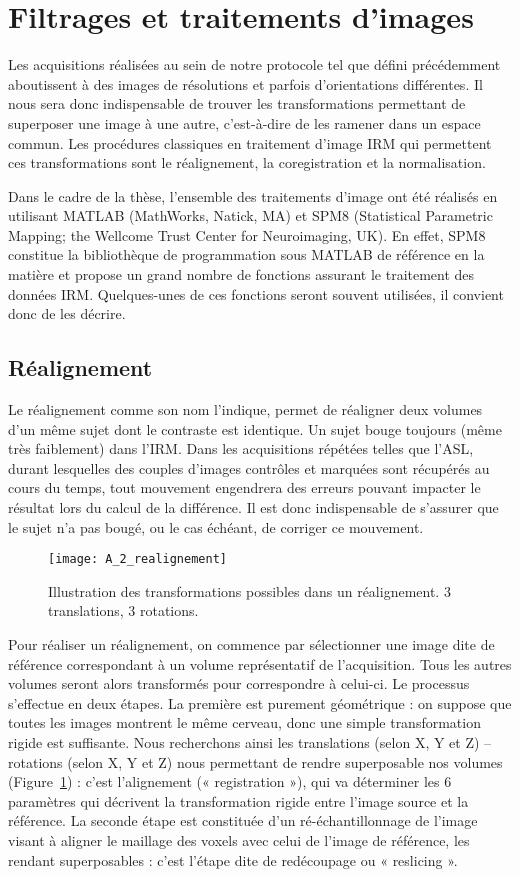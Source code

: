 \section{Filtrages et traitements d’images}
\label{sec:pretrait}
Les acquisitions réalisées au sein de notre protocole tel que défini précédemment aboutissent
à des images de résolutions et parfois d’orientations différentes. Il nous sera donc indispensable de
trouver les transformations permettant de superposer une image à une autre, c’est-à-dire de les
ramener dans un espace commun. Les procédures classiques en traitement d’image IRM qui
permettent ces transformations sont le réalignement, la coregistration et la normalisation.

Dans le cadre de la thèse, l’ensemble des traitements d’image ont été réalisés en utilisant
MATLAB (MathWorks, Natick, MA) et SPM8 (Statistical Parametric Mapping; the Wellcome Trust
Center for Neuroimaging, UK). En effet, SPM8 constitue la bibliothèque de programmation sous
MATLAB de référence en la matière et propose un grand nombre de fonctions assurant le traitement
des données IRM. Quelques-unes de ces fonctions seront souvent utilisées, il convient donc de les
décrire.
\subsection{Réalignement}
Le réalignement comme son nom l’indique, permet de réaligner deux volumes d’un même
sujet dont le contraste est identique. Un sujet bouge toujours (même très faiblement) dans l’IRM. Dans
les acquisitions répétées telles que l’ASL, durant lesquelles des couples d’images contrôles et
marquées sont récupérés au cours du temps, tout mouvement engendrera des erreurs pouvant
impacter le résultat lors du calcul de la différence. Il est donc indispensable de s’assurer que le sujet
n’a pas bougé, ou le cas échéant, de corriger ce mouvement.

\begin{figure}[!t]
\centering
\texttt{[image: A\_2\_realignement]}
\caption{Illustration des transformations possibles dans un réalignement. 3 translations, 3 rotations.}
\label{fig:A_2_realignement}	
\end{figure}
Pour réaliser un réalignement, on commence par sélectionner une image dite de référence
correspondant à un volume représentatif de l’acquisition. Tous les autres volumes seront alors
transformés pour correspondre à celui-ci. Le processus s’effectue en deux étapes. La première est
purement géométrique : on suppose que toutes les images montrent le même cerveau, donc une
simple transformation rigide est suffisante. Nous recherchons ainsi les translations (selon X, Y et Z) –
rotations (selon X, Y et Z) nous permettant de rendre superposable nos volumes (Figure~\ref{fig:A_2_realignement}) : c’est
l’alignement (« registration »), qui va déterminer les 6 paramètres qui décrivent la transformation
rigide entre l’image source et la référence. La seconde étape est constituée d’un ré-échantillonnage
de l’image visant à aligner le maillage des voxels avec celui de l’image de référence, les rendant
superposables : c’est l’étape dite de redécoupage ou « reslicing ».

